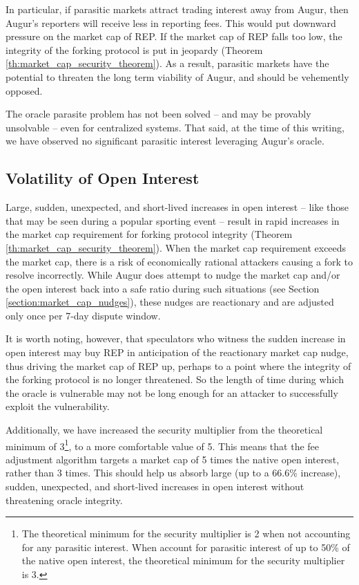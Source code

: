 \documentclass[floatfix,reprint,nofootinbib,amsmath,amssymb,epsfig,pre,floats,letterpaper,groupedaffiliation]{revtex4-1}
\theoremstyle{definition}
\theoremstyle{definition}
\begin{document}
In particular, if parasitic markets attract trading interest away from Augur, then Augur's reporters will receive less in reporting fees. This would put downward pressure on the market cap of REP. If the market cap of REP falls too low, the integrity of the forking protocol is put in jeopardy (Theorem \ref{th:market_cap_security_theorem}). As a result, parasitic markets have the potential to threaten the long term viability of Augur, and should be vehemently opposed.

The oracle parasite problem has not been solved -- and may be provably unsolvable -- even for centralized systems. That said, at the time of this writing, we have observed no significant parasitic interest leveraging Augur's oracle. 

\subsection{Volatility of Open Interest}

Large, sudden, unexpected, and short-lived increases in open interest -- like those that may be seen during a popular sporting event -- result in rapid increases in the market cap requirement for forking protocol integrity (Theorem \ref{th:market_cap_security_theorem}).  When the market cap requirement exceeds the market cap, there is a risk of economically rational attackers causing a fork to resolve incorrectly.  While Augur does attempt to nudge the market cap and/or the open interest back into a safe ratio during such situations (see Section \ref{section:market_cap_nudges}), these nudges are reactionary and are adjusted only once per 7-day dispute window.

It is worth noting, however, that speculators who witness the sudden increase in open interest may buy REP in anticipation of the reactionary market cap nudge, thus driving the market cap of REP up, perhaps to a point where the integrity of the forking protocol is no longer threatened.  So the length of time during which the oracle is vulnerable may not be long enough for an attacker to successfully exploit the vulnerability.

Additionally, we have increased the security multiplier from the theoretical minimum of 3\footnote{The theoretical minimum for the security multiplier is 2 when not accounting for any parasitic interest. When account for parasitic interest of up to 50\% of the native open interest, the theoretical minimum for the security multiplier is 3.}, to a more comfortable value of 5. This means that the fee adjustment algorithm targets a market cap of 5 times the native open interest, rather than 3 times. This should help us absorb large (up to a 66.6\% increase), sudden, unexpected, and short-lived increases in open interest without threatening oracle integrity.
\end{document}
